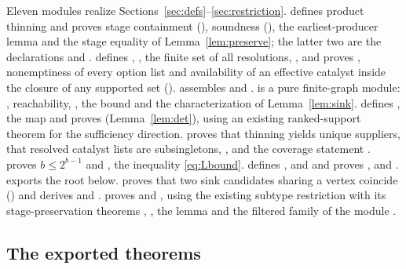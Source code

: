 \documentclass[11pt,a4paper]{article}
\theoremstyle{plain}
\theoremstyle{definition}
\theoremstyle{remark}
\begin{document}
Eleven modules realize Sections~\ref{sec:defs}--\ref{sec:restriction}.  defines product thinning  and proves stage containment (), soundness (), the earliest-producer lemma and the stage equality of Lemma~\ref{lem:preserve}; the latter two are the declarations  and .  defines , , the finite set  of all resolutions, , and proves , nonemptiness of every option list and availability of an effective catalyst inside the closure of any supported set ().  assembles  and .  is a pure finite-graph module: , reachability, , the bound  and the characterization  of Lemma~\ref{lem:sink}.  defines , the  map and proves  (Lemma~\ref{lem:det}), using an existing ranked-support theorem for the sufficiency direction.  proves that thinning yields unique suppliers, that resolved catalyst lists are subsingletons, , and the coverage statement .  proves $b\le2^{b-1}$ and , the inequality \eqref{eq:Lbound}.  defines ,  and  and proves ,  and .  exports the root below.  proves that two sink candidates sharing a vertex coincide () and derives  and .  proves  and , using the existing subtype restriction  with its stage-preservation theorems , , the lemma  and the filtered family  of the module .

\subsection{The exported theorems}
\end{document}
